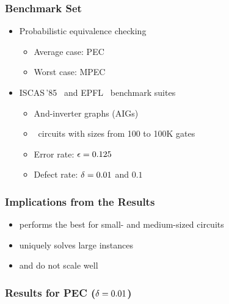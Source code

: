 \begin{frame}
    \frametitle{Benchmark Set}
    \begin{itemize}
        \item Probabilistic equivalence checking
              \begin{itemize}
                  \item Average case: PEC
                  \item Worst case: MPEC
              \end{itemize}
              \pause
        \item ISCAS\,'85~\cite{ISCAS85-benchmark}
              and EPFL~\cite{EPFL-benchmark} benchmark suites
              \begin{itemize}
                  \item And-inverter graphs (AIGs)
                  \item \ncircuit~circuits with sizes from 100 to 100K gates
                  \item Error rate: $\epsilon=0.125$
                  \item Defect rate: $\delta=0.01$ and $0.1$
              \end{itemize}
    \end{itemize}
\end{frame}

\begin{frame}
    \frametitle{Implications from the Results}
    \begin{itemize}
        \item \bddsp performs the best for small- and medium-sized circuits
              \pause
        \item \approxmc uniquely solves large instances
              \pause
        \item \cachet and \dcssat do not scale well
    \end{itemize}
\end{frame}

\begin{frame}
    \frametitle{Results for PEC ($\delta=0.01$)}
    \begin{table}
        \centering
        \tiny
    \end{table}
\end{frame}

